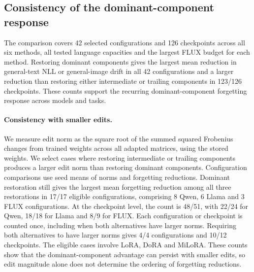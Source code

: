 \subsection{Consistency of the dominant-component response}\label{app:component-consistency}
The comparison covers 42 selected configurations and 126 checkpoints across all six methods, all tested language capacities and the largest FLUX budget for each method. Restoring dominant components gives the largest mean reduction in general-text NLL or general-image drift in all 42 configurations and a larger reduction than restoring either intermediate or trailing components in 123/126 checkpoints. These counts support the recurring dominant-component forgetting response across models and tasks.

\paragraph{Consistency with smaller edits.}
We measure edit norm as the square root of the summed squared Frobenius changes from trained weights across all adapted matrices, using the stored weights. We select cases where restoring intermediate or trailing components produces a larger edit norm than restoring dominant components. Configuration comparisons use seed means of norms and forgetting reductions. Dominant restoration still gives the largest mean forgetting reduction among all three restorations in 17/17 eligible configurations, comprising 8 Qwen, 6 Llama and 3 FLUX configurations. At the checkpoint level, the count is 48/51, with 22/24 for Qwen, 18/18 for Llama and 8/9 for FLUX. Each configuration or checkpoint is counted once, including when both alternatives have larger norms. Requiring both alternatives to have larger norms gives 4/4 configurations and 10/12 checkpoints. The eligible cases involve LoRA, DoRA and MiLoRA. These counts show that the dominant-component advantage can persist with smaller edits, so edit magnitude alone does not determine the ordering of forgetting reductions.
